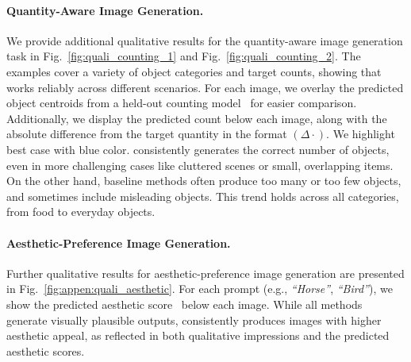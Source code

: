 \paragraph{Quantity-Aware Image Generation.}
We provide additional qualitative results for the quantity-aware image generation task in Fig.~\ref{fig:quali_counting_1} and Fig.~\ref{fig:quali_counting_2}. The examples cover a variety of object categories and target counts, showing that \methodname{} works reliably across different scenarios. 
For each image, we overlay the predicted object centroids from a held-out counting model~\cite{AminiNaieni2024countgd} for easier comparison. Additionally, we display the predicted count below each image, along with the absolute difference from the target quantity in the format $(\Delta\cdot)$. We highlight best case with blue color.
\methodname{} consistently generates the correct number of objects, even in more challenging cases like cluttered scenes or small, overlapping items. On the other hand, baseline methods often produce too many or too few objects, and sometimes include misleading objects. This trend holds across all categories, from food to everyday objects.


\paragraph{Aesthetic-Preference Image Generation.}
Further qualitative results for aesthetic-preference image generation are presented in Fig.~\ref{fig:appen:quali_aesthetic}. For each prompt (e.g., \textit{``Horse''}, \textit{``Bird''}), we show the predicted aesthetic score~\cite{schuhmann2022aesthetic} below each image. While all methods generate visually plausible outputs, \methodname{} consistently produces images with higher aesthetic appeal, as reflected in both qualitative impressions and the predicted aesthetic scores.



